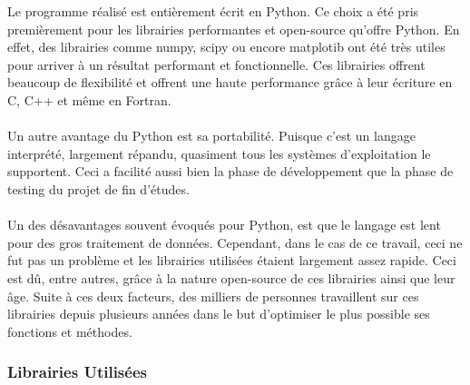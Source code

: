 \documentclass[11pt]{article}
\begin{document}
Le programme réalisé est entièrement écrit en Python.
Ce choix a été pris premièrement pour les librairies performantes et open-source qu'offre Python.
En effet, des librairies comme numpy, scipy ou encore matplotib ont été très utiles pour arriver à un résultat performant et fonctionnelle.
Ces librairies offrent beaucoup de flexibilité et offrent une haute performance grâce à leur écriture en C, C++ et même en Fortran.\\
\\
Un autre avantage du Python est sa portabilité.
Puisque c'est un langage interprété, largement répandu, quasiment tous les systèmes d'exploitation le supportent.
Ceci a facilité aussi bien la phase de développement que la phase de testing du projet de fin d'études.\\
\\
Un des désavantages souvent évoqués pour Python, est que le langage est lent pour des gros traitement de données.
Cependant, dans le cas de ce travail, ceci ne fut pas un problème et les librairies utilisées étaient largement assez rapide.
Ceci est dû, entre autres, grâce à la nature open-source de ces librairies ainsi que leur âge.
Suite à ces deux facteurs, des milliers de personnes travaillent sur ces librairies depuis plusieurs années dans le but d'optimiser le plus possible ses fonctions et méthodes.

\subsubsection{Librairies Utilisées}
\end{document}
